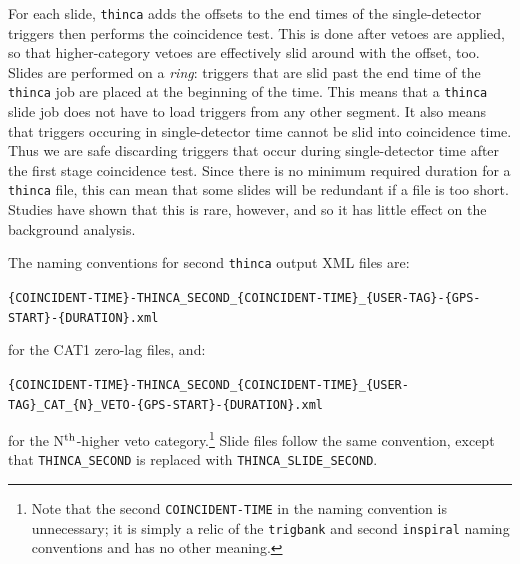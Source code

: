 For each slide, \texttt{thinca} adds the offsets to the end times of the
single-detector triggers then performs the coincidence test. This is done after
vetoes are applied, so that higher-category vetoes are effectively slid around
with the offset, too. Slides are performed on a \emph{ring}: triggers that are
slid past the end time of the \texttt{thinca} job are placed at the beginning
of the time. This means that a \texttt{thinca} slide job does not have to load
triggers from any other segment. It also means that triggers occuring in
single-detector time cannot be slid into coincidence time. Thus we are safe
discarding triggers that occur during single-detector time after the first
stage coincidence test. Since there is no minimum required duration for a
\texttt{thinca} file, this can mean that some slides will be redundant if a
file is too short. Studies have shown that this is rare, however, and so it has
little effect on the background analysis.

The naming conventions for second \texttt{thinca} output XML files are:
\begin{center}
\footnotesize{\texttt{\{COINCIDENT-TIME\}-THINCA\_SECOND\_\{COINCIDENT-TIME\}\_\{USER-TAG\}-\{GPS-START\}-\{DURATION\}.xml}}
\end{center}
for the CAT1 zero-lag files, and:
\begin{center}
\footnotesize{\texttt{\{COINCIDENT-TIME\}-THINCA\_SECOND\_\{COINCIDENT-TIME\}\_\{USER-TAG\}\_CAT\_\{N\}\_VETO-\{GPS-START\}-\{DURATION\}.xml}}
\end{center}
for the N$^{\mathrm{th}}$-higher veto category.\footnote{Note that the second
\texttt{COINCIDENT-TIME} in the naming convention is unnecessary; it is simply a relic
of the \texttt{trigbank} and second \texttt{inspiral} naming conventions and
has no other meaning.} Slide files follow the same convention, except that
\texttt{THINCA\_SECOND} is replaced with \texttt{THINCA\_SLIDE\_SECOND}.

